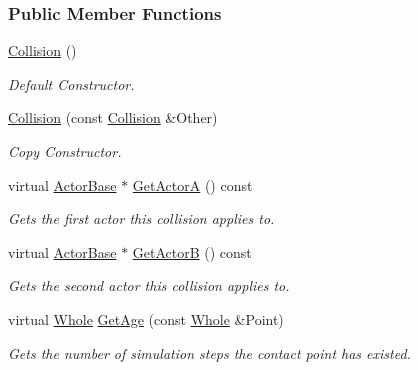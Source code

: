\subsubsection*{Public Member Functions}
\begin{DoxyCompactItemize}
\item 
\hypertarget{classMezzanine_1_1Collision_a2eeacd2ab527b1d5e414917db41d580b}{
\hyperlink{classMezzanine_1_1Collision_a2eeacd2ab527b1d5e414917db41d580b}{Collision} ()}
\label{classMezzanine_1_1Collision_a2eeacd2ab527b1d5e414917db41d580b}

\begin{DoxyCompactList}\small\item\em Default Constructor. \item\end{DoxyCompactList}\item 
\hyperlink{classMezzanine_1_1Collision_a1170d2c2e674ab3e9b1bf68c91171db4}{Collision} (const \hyperlink{classMezzanine_1_1Collision}{Collision} \&Other)
\begin{DoxyCompactList}\small\item\em Copy Constructor. \item\end{DoxyCompactList}\item 
virtual \hyperlink{classMezzanine_1_1ActorBase}{ActorBase} $\ast$ \hyperlink{classMezzanine_1_1Collision_a8b54f6c8629299f7e55141d5fccc374d}{GetActorA} () const 
\begin{DoxyCompactList}\small\item\em Gets the first actor this collision applies to. \item\end{DoxyCompactList}\item 
virtual \hyperlink{classMezzanine_1_1ActorBase}{ActorBase} $\ast$ \hyperlink{classMezzanine_1_1Collision_a36e8d3977e93201881637d324a5cf90f}{GetActorB} () const 
\begin{DoxyCompactList}\small\item\em Gets the second actor this collision applies to. \item\end{DoxyCompactList}\item 
virtual \hyperlink{namespaceMezzanine_adcbb6ce6d1eb4379d109e51171e2e493}{Whole} \hyperlink{classMezzanine_1_1Collision_ad9d72f1d883214242803b72d1b82c343}{GetAge} (const \hyperlink{namespaceMezzanine_adcbb6ce6d1eb4379d109e51171e2e493}{Whole} \&Point)
\begin{DoxyCompactList}\small\item\em Gets the number of simulation steps the contact point has existed. \item\end{DoxyCompactList}\item 

\end{DoxyCompactItemize}
